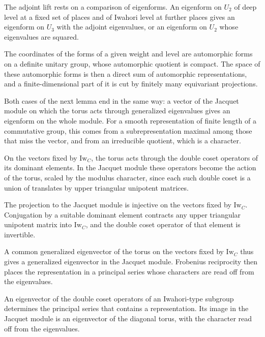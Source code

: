 The adjoint lift rests on a comparison of eigenforms. An eigenform on $U_2$ of deep level at a fixed set of places and of Iwahori level at further places gives an eigenform on $U_3$ with the adjoint eigenvalues, or an eigenform on $U_2$ whose eigenvalues are squared.

The coordinates of the forms of a given weight and level are automorphic forms on a definite unitary group, whose automorphic quotient is compact. The space of these automorphic forms is then a direct sum of automorphic representations, and a finite-dimensional part of it is cut by finitely many equivariant projections.

Both cases of the next lemma end in the same way: a vector of the Jacquet module on which the torus acts through generalized eigenvalues gives an eigenform on the whole module. For a smooth representation of finite length of a commutative group, this comes from a subrepresentation maximal among those that miss the vector, and from an irreducible quotient, which is a character.

On the vectors fixed by $\mathrm{Iw}_C$, the torus acts through the double coset operators of its dominant elements. In the Jacquet module these operators become the action of the torus, scaled by the modulus character, since each such double coset is a union of translates by upper triangular unipotent matrices.

The projection to the Jacquet module is injective on the vectors fixed by $\mathrm{Iw}_C$. Conjugation by a suitable dominant element contracts any upper triangular unipotent matrix into $\mathrm{Iw}_C$, and the double coset operator of that element is invertible.

A common generalized eigenvector of the torus on the vectors fixed by $\mathrm{Iw}_C$ thus gives a generalized eigenvector in the Jacquet module. Frobenius reciprocity then places the representation in a principal series whose characters are read off from the eigenvalues.

An eigenvector of the double coset operators of an Iwahori-type subgroup determines the principal series that contains a representation. Its image in the Jacquet module is an eigenvector of the diagonal torus, with the character read off from the eigenvalues.

